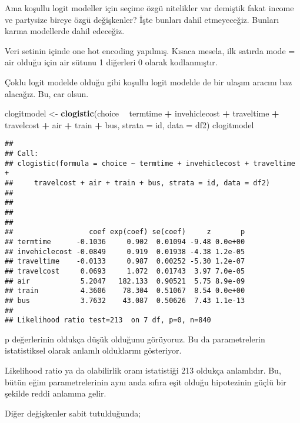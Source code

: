 \documentclass[
]{book}
\newenvironment{Shaded}{\begin{snugshade}}{\end{snugshade}}
\newcommand{\DataTypeTok}[1]{\textcolor[rgb]{0.13,0.29,0.53}{#1}}
\newcommand{\KeywordTok}[1]{\textcolor[rgb]{0.13,0.29,0.53}{\textbf{#1}}}
\newcommand{\NormalTok}[1]{#1}
\newcommand{\OperatorTok}[1]{\textcolor[rgb]{0.81,0.36,0.00}{\textbf{#1}}}
\newcommand{\StringTok}[1]{\textcolor[rgb]{0.31,0.60,0.02}{#1}}
\begin{document}
Ama koşullu logit modeller için seçime özgü nitelikler var demiştik fakat income ve partysize bireye özgü değişkenler? İşte bunları dahil etmeyeceğiz. Bunları karma modellerde dahil edeceğiz.

Veri setinin içinde one hot encoding yapılmış. Kısaca mesela, ilk satırda mode = air olduğu için air sütunu 1 diğerleri 0 olarak kodlanmıştır.

Çoklu logit modelde olduğu gibi koşullu logit modelde de bir ulaşım aracını baz alacağız. Bu, car olsun.

\begin{Shaded}
\begin{Highlighting}[]
\NormalTok{clogitmodel <-}\StringTok{ }\KeywordTok{clogistic}\NormalTok{(choice }\OperatorTok{~}\StringTok{ }\NormalTok{termtime }\OperatorTok{+}\StringTok{ }\NormalTok{invehiclecost }\OperatorTok{+}\StringTok{ }\NormalTok{traveltime }\OperatorTok{+}\StringTok{ }\NormalTok{travelcost }\OperatorTok{+}\StringTok{ }\NormalTok{air }\OperatorTok{+}\StringTok{ }\NormalTok{train }\OperatorTok{+}\StringTok{ }\NormalTok{bus, }\DataTypeTok{strata =}\NormalTok{ id, }\DataTypeTok{data =}\NormalTok{ df2)}
\NormalTok{clogitmodel}
\end{Highlighting}
\end{Shaded}

\begin{verbatim}
## 
## Call: 
## clogistic(formula = choice ~ termtime + invehiclecost + traveltime + 
##     travelcost + air + train + bus, strata = id, data = df2)
## 
## 
## 
## 
##                  coef exp(coef) se(coef)     z       p
## termtime      -0.1036     0.902  0.01094 -9.48 0.0e+00
## invehiclecost -0.0849     0.919  0.01938 -4.38 1.2e-05
## traveltime    -0.0133     0.987  0.00252 -5.30 1.2e-07
## travelcost     0.0693     1.072  0.01743  3.97 7.0e-05
## air            5.2047   182.133  0.90521  5.75 8.9e-09
## train          4.3606    78.304  0.51067  8.54 0.0e+00
## bus            3.7632    43.087  0.50626  7.43 1.1e-13
## 
## Likelihood ratio test=213  on 7 df, p=0, n=840
\end{verbatim}

p değerlerinin oldukça düşük olduğunu görüyoruz. Bu da parametrelerin istatistiksel olarak anlamlı olduklarını gösteriyor.

Likelihood ratio ya da olabilirlik oranı istatistiği 213 oldukça anlamlıdır. Bu, bütün eğim parametrelerinin aynı anda sıfıra eşit olduğu hipotezinin güçlü bir şekilde reddi anlamına gelir.

Diğer değişkenler sabit tutulduğunda;
\end{document}
